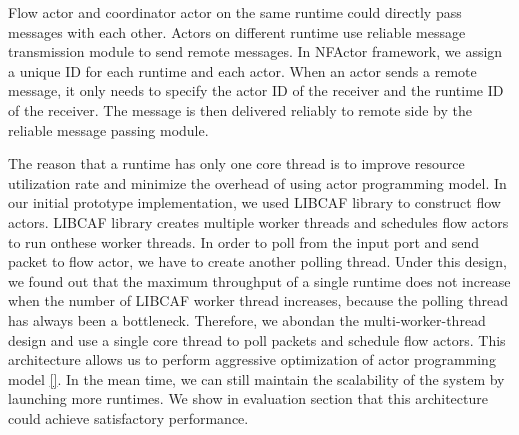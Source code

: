 Flow actor and coordinator actor on the same runtime could directly pass messages with each other. Actors on different runtime use reliable message transmission module to send remote messages. In NFActor framework, we assign a unique ID for each runtime and each actor. When an actor sends a remote message, it only needs to specify the actor ID of the receiver and the runtime ID of the receiver. The message is then delivered reliably to remote side by the reliable message passing module.



The reason that a runtime has only one core thread is to improve resource utilization rate and minimize the overhead of using actor programming model. In our initial prototype implementation, we used LIBCAF \cite{caf} library to construct flow actors. LIBCAF library creates multiple worker threads and schedules flow actors to run onthese worker threads. In order to poll from the input port and send packet to flow actor, we have to create another polling thread. Under this design, we found out that the maximum throughput of a single runtime does not increase when the number of LIBCAF worker thread increases, because the polling thread has always been a bottleneck. Therefore, we abondan the multi-worker-thread design and use a single core thread to poll packets and schedule flow actors. This architecture allows us to perform aggressive optimization of actor programming model \ref{}. In the mean time, we can still maintain the scalability of the system by launching more runtimes. We show in evaluation section that this architecture could achieve satisfactory performance.

